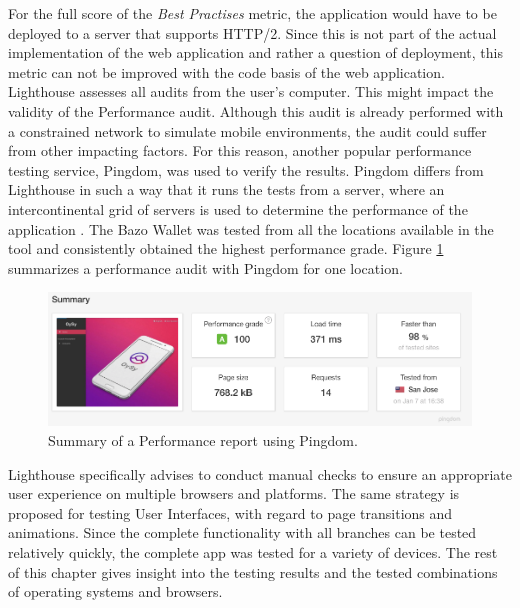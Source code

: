 For the full score of the \textit{Best Practises} metric, the application would have to be deployed to a server that supports HTTP/2. Since this is not part of the actual implementation of the web application and rather a question of deployment, this metric can not be improved with the code basis of the web application.
Lighthouse assesses all audits from the user's computer. This might impact the validity of the Performance audit. Although this audit is already performed with a constrained network to simulate mobile environments, the audit could suffer from other impacting factors. For this reason, another popular performance testing service, Pingdom, was used to verify the results. Pingdom differs from Lighthouse in such a way that it runs the tests from a server, where an intercontinental grid of servers is used to determine the performance of the application \cite{pingdom}. The Bazo Wallet was tested from all the locations available in the tool and consistently obtained the highest performance grade. Figure \ref{fig:pingdom} summarizes a performance audit with Pingdom for one location.
\begin{figure}
\centering
\includegraphics[width=1\textwidth]{screenshots/pingdom.png}
\caption{\label{fig:pingdom}Summary of a Performance report using Pingdom.}
\end{figure}

Lighthouse specifically advises to conduct manual checks to ensure an appropriate user experience on multiple browsers and platforms. The same strategy is proposed for testing User Interfaces, with regard to page transitions and animations.
Since the complete functionality with all branches can be tested relatively quickly, the complete app was tested for a variety of devices. The rest of this chapter gives insight into the testing results and the tested combinations of operating systems and browsers.



